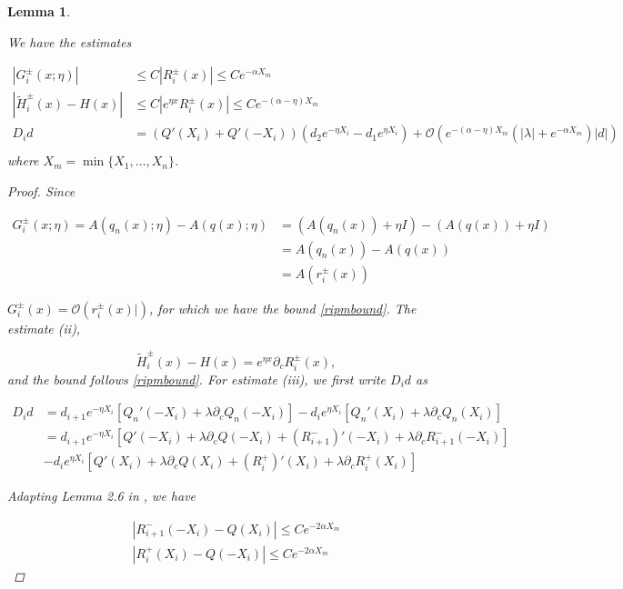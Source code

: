 \documentclass[12pt]{article}
\newtheorem{lemma}{Lemma}
\begin{document}
\begin{lemma}\label{estimates}

We have the estimates

\begin{align*}
|G_i^\pm(x; \eta)| &\leq C|R_i^\pm(x)| \leq C e^{-\alpha X_m} \\
| \tilde{H}_i^\pm(x)  - H(x) | & \leq C | e^{\eta x} R_i^\pm(x)| \leq C e^{-(\alpha - \eta) X_m}  \\
D_i d &= ( Q'(X_i) + Q'(-X_i) )(d_2 e^{-\eta X_i} - d_1 e^{\eta X_i}) + \mathcal{O} \left( e^{-(\alpha - \eta) X_m}\left( |\lambda| +  e^{-\alpha X_m} \right) |d| \right) \\
\end{align*}
where $X_m = \min\{X_1, \dots, X_n\}$.

\begin{proof}
Since 

\begin{align*}
G_i^\pm(x; \eta) = A(q_n(x); \eta) - A(q(x); \eta) &= (A(q_n(x)) + \eta I) - (A(q(x)) + \eta I) \\
&= A(q_n(x)) - A(q(x)) \\
&= A(r_i^\pm(x))
\end{align*}

$G_i^\pm(x) = \mathcal{O}(r_i^\pm(x)|)$, for which we have the bound \eqref{ripmbound}. The estimate (ii),

\[
\tilde{H}_i^\pm(x)  - H(x) = e^{\eta x} \partial_c R_i^\pm(x),
\]
and the bound follows \eqref{ripmbound}. For estimate (iii), we first write $D_i d$ as

\begin{align*}
D_i d &= d_{i+1} e^{-\eta X_i}[ Q_n'(-X_i) + \lambda \partial_c Q_n(-X_i)] 
- d_i e^{\eta X_i}[ Q_n'(X_i) + \lambda \partial_c Q_n(X_i)]  \\
&= d_{i+1} e^{-\eta X_i} [ Q'(-X_i) + \lambda \partial_c Q(-X_i) + (R_{i+1}^-)'(-X_i) + \lambda  \partial_c R_{i+1}^-(-X_i)] \\
&- d_i e^{\eta X_i} [ Q'(X_i) + \lambda \partial_c Q(X_i) + (R_i^+)'(X_i) + \lambda \partial_c R_i^+(X_i)] 
\end{align*}

Adapting Lemma 2.6 in \cite{Sandstede1998}, we have

\begin{align*}
|R_{i+1}^-(-X_i) - Q(X_i)| \leq C e^{-2 \alpha X_m} \\
|R_{i}^+(X_i) - Q(-X_i)| \leq C e^{-2 \alpha X_m}
\end{align*}


\end{proof}
\end{lemma}
\end{document}
